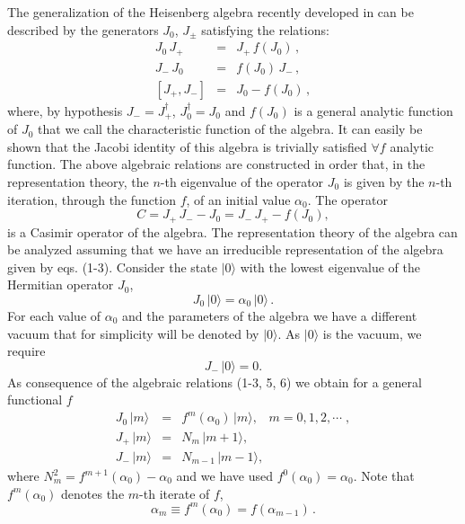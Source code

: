 \documentclass[a4paper,12pt]{article}
\begin{document}
The generalization of the Heisenberg algebra recently developed in
\cite{algebra1,algebra2} can be described by the generators 
$J_{0}$, $J_{\pm}$ satisfying the relations: 
\begin{eqnarray}
J_{0} \, J_{+} &=& J_{+} \, f(J_{0}) \, , 
\label{eq:j+g} \\
J_{-} \, J_{0} &=& f(J_{0}) \, J_{-} \, , 
\label{eq:j-g} \\
\left[ J_{+},J_{-} \right] &=& J_{0}-f(J_{0}) \, ,
\label{eq:j0g}
\end{eqnarray}
where, by hypothesis $J_{-}=J_{+}^{\dagger}$, $J_{0}^{\dagger}=J_{0}$ 
and $f(J_{0})$
is a general analytic function of $J_{0}$ that we call the
characteristic function of the algebra. It can easily be shown that
the Jacobi identity of this algebra is trivially satisfied $\forall 
f$ analytic function.
The above algebraic relations 
are constructed in order that, in the representation theory, 
the $n$-th eigenvalue
of the operator $J_{0}$ is given by the $n$-th iteration,  
through the function $f$, of an initial value $\alpha_{0}$. 
The operator
\begin{equation}
C = J_{+} \, J_{-} - J_{0} = J_{-} \, J_{+} - f(J_{0}) , 
\label{eq:casimir}
\end{equation}
is a Casimir operator of the algebra. The representation theory 
of the algebra can be analyzed assuming that we have an 
irreducible representation of the algebra given by eqs. (1-3). 
Consider the state $|0\rangle$ with the lowest 
eigenvalue of  the Hermitian operator $J_{0}$, 
\begin{equation}
J_{0} \, |0\rangle = \alpha_{0} \, |0\rangle \, .
\label{vacuum}
\end{equation}
For each value of $\alpha_{0}$ and the parameters of the algebra
we have a different vacuum that for simplicity will be denoted by
$|0\rangle$. As $|0\rangle$ is the vacuum, we require
\begin{equation}
J_{-} \, |0\rangle = 0 .
\label{vacuum2}
\end{equation}
As consequence of the algebraic relations (1-3, 5, 6) we obtain for a general
functional $f$  
\begin{eqnarray}
J_{0} \, |m\rangle &=& f^{m}(\alpha_0) \, |m\rangle , \; \; \; m = 0,1,2, 
\cdots \; , 
\label{fm} \\
J_{+} \, |m\rangle &=& N_{m} \, |m+1\rangle , 
\label{nm} \\
J_{-} \, |m\rangle &=& N_{m-1} \, |m-1\rangle ,
\label{nm1}
\end{eqnarray}
where $N_{m}^2 = f^{m+1}(\alpha_0)-\alpha_0$ 
and we have used $f^0(\alpha_{0}) = \alpha_{0} $. 
Note that $f^m(\alpha_0)$
denotes the $m$-th iterate of $f$, 
\begin{equation}
\alpha_m \equiv f^m(\alpha_0) = f(\alpha_{m-1}) \, .
\label{recursion}
\end{equation}
\end{document}
